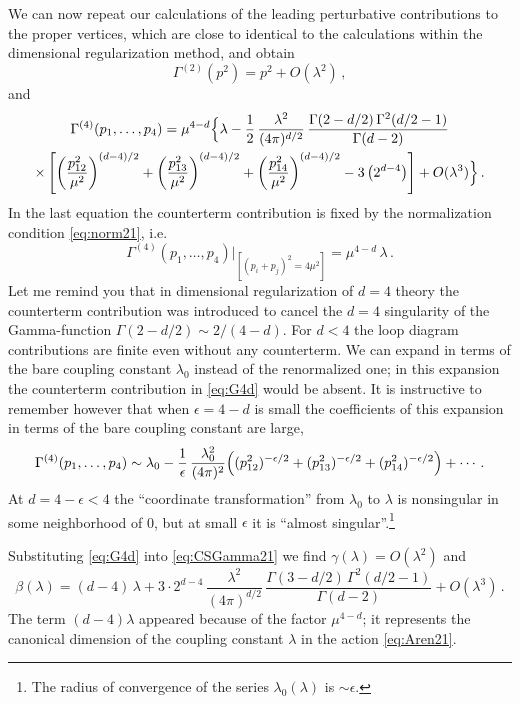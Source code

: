 We can now repeat our calculations of the leading perturbative contributions to
the proper vertices, which are close to identical to the calculations within the
dimensional regularization method, and obtain
\[
\Gamma^{(2)}(p^2)=p^2+O(\lambda^2)\,,
\]
and
\begin{multline}\label{eq:G4d}
\Gamma^{(4)}(p_1,\dots,p_4)=\mu^{4-d}\Bigl\{\lambda-\frac12\,\frac{\lambda^2}{(4\pi)^{d/2}}\,\frac{\Gamma(2-d/2)\,\Gamma^2(d/2-1)}{\Gamma(d-2)}\\
\times\left[\left(\frac{p_{12}^2}{\mu^2}\right)^{(d-4)/2}+\left(\frac{p_{13}^2}{\mu^2}\right)^{(d-4)/2}+\left(\frac{p_{14}^2}{\mu^2}\right)^{(d-4)/2}-3\,\bigl(2^{d-4}\bigr)\right]+O(\lambda^3)\Bigr\}\,.
\end{multline}
In the last equation the counterterm contribution is fixed by the normalization
condition \eqref{eq:norm21}, i.e.
\[
\Gamma^{(4)}(p_1,\dots,p_4)\big|_{[(p_i+p_j)^2=4\mu^2]}=\mu^{4-d}\,\lambda\,.
\]
Let me remind you that in dimensional regularization of $d=4$ theory the
counterterm contribution was introduced to cancel the $d=4$ singularity of the
Gamma-function $\Gamma(2-d/2)\sim2/(4-d)$. For $d<4$ the loop diagram contributions
are finite even without any counterterm. We can expand in terms of the bare
coupling constant $\lambda_0$ instead of the renormalized one; in this expansion
the counterterm contribution in \eqref{eq:G4d} would be absent. It is instructive
to remember however that when $\epsilon=4-d$ is small the coefficients of this
expansion in terms of the bare coupling constant are large,
\begin{equation}\label{eq:G4bare}
\Gamma^{(4)}(p_1,\dots,p_4)\sim\lambda_0-\frac1\epsilon\,\frac{\lambda_0^2}{(4\pi)^2}\Bigl((p_{12}^2)^{-\epsilon/2}+(p_{13}^2)^{-\epsilon/2}+(p_{14}^2)^{-\epsilon/2}\Bigr)+\cdots\,.
\end{equation}
At $d=4-\epsilon<4$ the ``coordinate transformation'' from $\lambda_0$ to $\lambda$
is nonsingular in some neighborhood of 0, but at small $\epsilon$ it is ``almost
singular''.\footnote{The radius of convergence of the series $\lambda_0(\lambda)$
is $\sim\epsilon$.}

Substituting \eqref{eq:G4d} into \eqref{eq:CSGamma21} we find
$\gamma(\lambda)=O(\lambda^2)$ and
\[
\beta(\lambda)=(d-4)\,\lambda+3\cdot2^{d-4}\,\frac{\lambda^2}{(4\pi)^{d/2}}\,\frac{\Gamma(3-d/2)\,\Gamma^2(d/2-1)}{\Gamma(d-2)}+O(\lambda^3)\,.
\]
The term $(d-4)\lambda$ appeared because of the factor $\mu^{4-d}$; it represents
the canonical dimension of the coupling constant $\lambda$ in the action
\eqref{eq:Aren21}.

